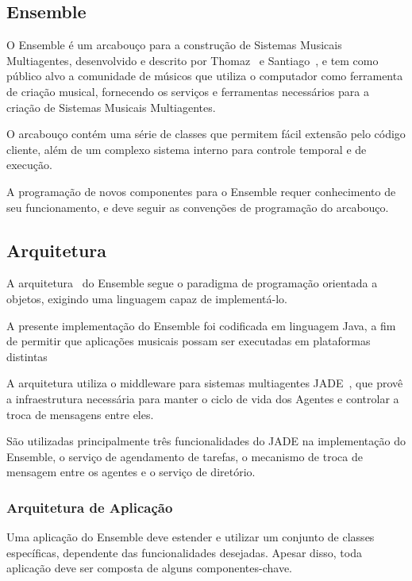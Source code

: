 \documentclass[a4paper, 11pt, twoside]{article}
\begin{document}
\begin{multicols}{2}
\section{Ensemble}

O Ensemble é um arcabouço para a construção de Sistemas Musicais Multiagentes, 
desenvolvido e descrito por Thomaz~\cite{leandro11} e 
Santiago~\cite{santiago12}, e tem como público alvo a comunidade de músicos que
utiliza o computador como ferramenta de criação musical, fornecendo os serviços
e ferramentas necessários para a criação de Sistemas Musicais Multiagentes. 

O arcabouço contém uma série de classes que permitem fácil extensão pelo
código cliente, além de um complexo sistema interno para
controle temporal e de execução.

A programação de novos componentes para o Ensemble requer conhecimento de seu 
funcionamento, e deve seguir as convenções de programação do arcabouço. 

\subsection{Arquitetura}

A arquitetura~\cite{leandro11} do Ensemble segue o paradigma de programação 
orientada a objetos, exigindo uma linguagem capaz de implementá-lo.

A presente implementação do Ensemble foi codificada em linguagem Java, a fim de
permitir que aplicações musicais possam ser executadas em plataformas distintas

A arquitetura utiliza o middleware para sistemas multiagentes JADE~\cite{belli99}, 
que provê a infraestrutura necessária para manter o ciclo de vida dos Agentes e
controlar a troca de mensagens entre eles.

São utilizadas principalmente três funcionalidades do JADE na implementação do
Ensemble, o serviço de agendamento de tarefas, o mecanismo de troca de mensagem
entre os agentes e o serviço de diretório.

\subsubsection{Arquitetura de Aplicação}

Uma aplicação do Ensemble deve estender e utilizar um conjunto de classes
específicas, dependente das funcionalidades desejadas. Apesar disso,
toda aplicação deve ser composta de alguns componentes-chave. 


\end{multicols}
\end{document}
